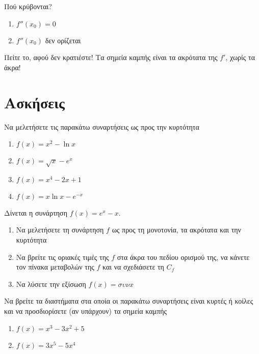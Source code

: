 \documentclass{../presentation}
\begin{document}
\begin{frame}{Πού κρύβονται?}
  \begin{enumerate}
    \item<1-> $f''(x_0)=0$
    \item<2-> $f''(x_0)$ δεν ορίζεται
  \end{enumerate}
   {Πείτε το, αφού δεν κρατιέστε! Τα σημεία καμπής είναι τα ακρότατα της $f'$, χωρίς τα άκρα!}
\end{frame}

\section{Ασκήσεις}
\begin{askisi}
  Να μελετήσετε τις παρακάτω συναρτήσεις ως προς την κυρτότητα
  \begin{enumerate}
    \item<1-> $f(x)=x^2-\ln x$
    \item<2-> $f(x)=\sqrt{x}-e^x$
    \item<3-> $f(x)=x^4-2x+1$
    \item<4-> $f(x)=x\ln x-e^{-x}$
  \end{enumerate}

\end{askisi}

\begin{askisi}
  Δίνεται η συνάρτηση $f(x)=e^x-x$.
  \begin{enumerate}
    \item<1-> Να μελετήσετε τη συνάρτηση $f$ ως προς τη μονοτονία, τα ακρότατα και την κυρτότητα
    \item<2-> Να βρείτε τις οριακές τιμές της $f$ στα άκρα του πεδίου ορισμού της, να κάνετε τον πίνακα μεταβολών της $f$ και να σχεδιάσετε τη $C_f$
    \item<3-> Να λύσετε την εξίσωση $f(x)=συνx$
  \end{enumerate}

\end{askisi}

\begin{askisi}
  Να βρείτε τα διαστήματα στα οποία οι παρακάτω συναρτήσεις είναι κυρτές ή κοίλες και να προσδιορίσετε (αν υπάρχουν) τα σημεία καμπής
  \begin{enumerate}
    \item<1-> $f(x)=x^3-3x^2+5$
    \item<2-> $f(x)=3x^5-5x^4$
  \end{enumerate}

\end{askisi}
\end{document}
